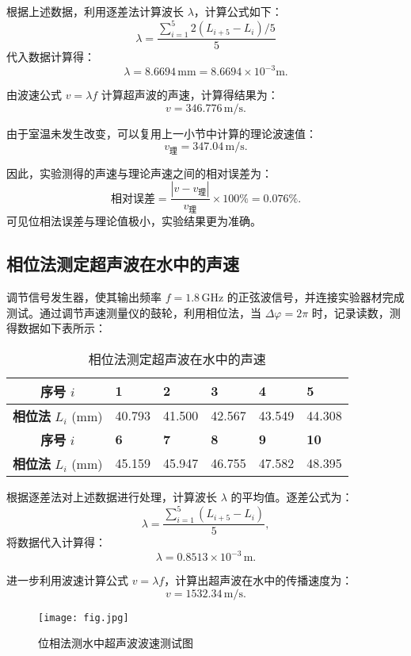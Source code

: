 \documentclass[UTF-8,twoside,cs4size]{ctexart}
\begin{document}
    根据上述数据，利用逐差法计算波长 $\lambda$，计算公式如下：
    \[
    \lambda = \frac{\sum_{i=1}^{5} 2(L_{i+5} - L_i)/5}{5}
    \]
    代入数据计算得：
    \[
    \lambda = 8.6694\,\mathrm{mm} = 8.6694 \times 10^{-3} \mathrm{m}.
    \]
    
    由波速公式 $v = \lambda f$ 计算超声波的声速，计算得结果为：
    \[
    v = 346.776\,\mathrm{m/s}.
    \]
    
    由于室温未发生改变，可以复用上一小节中计算的理论波速值：
    \[
    v_{\text{理}} = 347.04\,\mathrm{m/s}.
    \]
    
    因此，实验测得的声速与理论声速之间的相对误差为：
    \[
    \text{相对误差} = \frac{|v - v_{\text{理}}|}{v_{\text{理}}} \times 100\% = 0.076\%.
    \]
	可见位相法误差与理论值极小，实验结果更为准确。

    \subsection{相位法测定超声波在水中的声速}

    调节信号发生器，使其输出频率 $f = 1.8\,\mathrm{GHz}$ 的正弦波信号，并连接实验器材完成测试。通过调节声速测量仪的鼓轮，利用相位法，当 $\Delta\varphi = 2\pi$ 时，记录读数，测得数据如下表所示：
    
    \begin{table}[!h]
        \centering
        \renewcommand\arraystretch{1.4}
        \captionsetup{skip=0pt}
        \caption{相位法测定超声波在水中的声速}
        \begin{tabularx}{\textwidth}{|c|Y|Y|Y|Y|Y|}
            \hline
            \textbf{序号} $i$ & \textbf{1} & \textbf{2} & \textbf{3} & \textbf{4} & \textbf{5} \\
            \hline
            \textbf{相位法} $L_i$ (mm) & 40.793 & 41.500 & 42.567 & 43.549 & 44.308 \\
            \hline
            \textbf{序号} $i$ & \textbf{6} & \textbf{7} & \textbf{8} & \textbf{9} & \textbf{10} \\
            \hline
            \textbf{相位法} $L_i$ (mm) & 45.159 & 45.947 & 46.755 & 47.582 & 48.395 \\
            \hline
        \end{tabularx}
    \end{table}
    
    根据逐差法对上述数据进行处理，计算波长 $\lambda$ 的平均值。逐差公式为：
    \[
    \lambda = \frac{\sum_{i=1}^{5}(L_{i+5} - L_i)}{5},
    \]
    将数据代入计算得：
    \[
    \lambda = 0.8513 \times 10^{-3}\,\mathrm{m}.
    \]
    
    进一步利用波速计算公式 $v = \lambda f$，计算出超声波在水中的传播速度为：
    \[
    v = 1532.34\,\mathrm{m/s}.
    \]
    \newpage
    \begin{figure}[!h]
        \centering
        \texttt{[image: fig.jpg]}
        \caption{位相法测水中超声波波速测试图}
    \end{figure}
\end{document}
